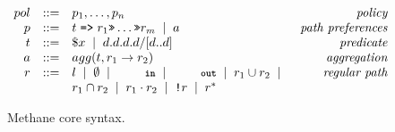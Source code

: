 \documentclass[numbers, 10pt, preprint]{sigplanconf}
\newcommand{\sysname}{{\small \sf Methane}\xspace}
\newcommand{\KW}[1]{\texttt{\small\bfseries{#1}}}
\newcommand{\Prefer}{\texttt{>>}}
\newcommand{\Path}{\texttt{=>}}
\newcommand{\In}{\KW{in}}
\newcommand{\Out}{\KW{out}}
\newcommand{\NOT}{\texttt{!}}
\newcommand{\BNFALT}{\;\;|\;\;}
\begin{document}


\begin{figure}[t]\small
  \begin{minipage}[t]{\linewidth}
  \vspace*{-1\baselineskip}
  \[ \begin{array}{rclr}
     pol     &::=& p_1, \dots, p_n & \textit{policy} \\
     p       &::=& t \hspace{.3em} \Path \hspace{.3em} r_1 \Prefer \dots \Prefer r_m \BNFALT a & \textit{path preferences}  \\
     t       &::=& \$x \BNFALT d.d.d.d/[d..d] \hspace{1.5em} & \textit{predicate} \\
     a      &::=& agg(t, r_1 \rightarrow r_2) & \textit{aggregation} \\
     r       &::=& l \BNFALT \emptyset \BNFALT \In \BNFALT \Out \BNFALT r_1 \cup r_2 \BNFALT & \textit{regular path} \\
             &   & r_1 \cap r_2 \BNFALT r_1 \cdot r_2 \BNFALT \NOT r \BNFALT r^* \\
  \end{array} \]%

  \end{minipage}
  \vspace{-.3em}
  \caption{\sysname core syntax.}
  \label{fig:syntax}
\end{figure}%
\end{document}
